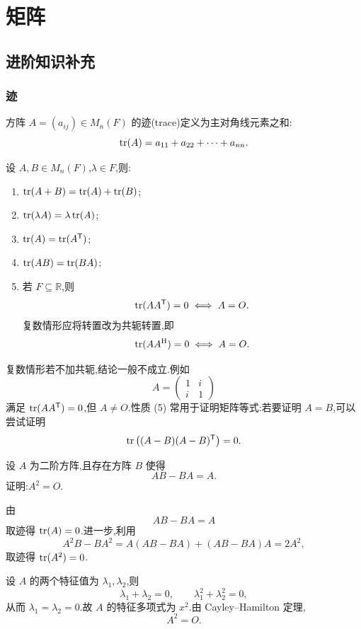 \setcounter{chapter}{2}
\pagestyle{fancy}

\chapter{矩阵}

\section{进阶知识补充}

\subsection{迹}

\begin{definition}
方阵 $A=(a_{ij})\in M_n(F)$ 的迹(trace)定义为主对角线元素之和:
\[
\operatorname{tr}(A)=a_{11}+a_{22}+\cdots+a_{nn}.
\]
\end{definition}

\begin{theorem}[\markstar]
设 $A,B\in M_n(F)$,$\lambda\in F$,则:
\begin{enumerate}
  \item $\operatorname{tr}(A+B)=\operatorname{tr}(A)+\operatorname{tr}(B)$;
  \item $\operatorname{tr}(\lambda A)=\lambda\operatorname{tr}(A)$;
  \item $\operatorname{tr}(A)=\operatorname{tr}(A^{\mathsf T})$;
  \item $\operatorname{tr}(AB)=\operatorname{tr}(BA)$;
  \item 若 $F\subseteq\mathbb{R}$,则
  \[
  \operatorname{tr}(AA^{\mathsf T})=0\iff A=O.
  \]
  复数情形应将转置改为共轭转置,即
  \[
  \operatorname{tr}(AA^{\mathrm H})=0\iff A=O.
  \]
\end{enumerate}
\end{theorem}

\begin{remark}
复数情形若不加共轭,结论一般不成立.例如
\[
A=\begin{pmatrix}1&i\\ i&1\end{pmatrix}
\]
满足 $\operatorname{tr}(AA^{\mathsf T})=0$,但 $A\neq O$.性质 (5) 常用于证明矩阵等式:若要证明 $A=B$,可以尝试证明
\[
\operatorname{tr}\left((A-B)(A-B)^{\mathsf T}\right)=0.
\]
\end{remark}

\begin{example}
设 $A$ 为二阶方阵,且存在方阵 $B$ 使得
\[
AB-BA=A.
\]
证明:$A^2=O$.
\end{example}
\exampleblank

\begin{solution}
由
\[
AB-BA=A
\]
取迹得 $\operatorname{tr}(A)=0$.进一步,利用
\[
A^2B-BA^2=A(AB-BA)+(AB-BA)A=2A^2,
\]
取迹得 $\operatorname{tr}(A^2)=0$.

设 $A$ 的两个特征值为 $\lambda_1,\lambda_2$,则
\[
\lambda_1+\lambda_2=0,
\qquad
\lambda_1^2+\lambda_2^2=0,
\]
从而 $\lambda_1=\lambda_2=0$.故 $A$ 的特征多项式为 $x^2$.由 Cayley--Hamilton 定理,
\[
\boxed{A^2=O}.
\]
\end{solution}

